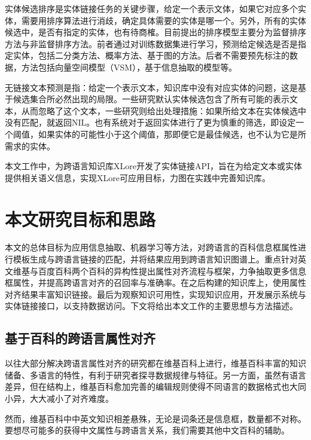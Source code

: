 {\heiti 实体候选排序}是实体链接任务的关键步骤，给定一个表示文体，如果它对应多个实体，需要用排序算法进行消歧，确定具体需要的实体是哪一个。另外，所有的实体候选中，是否有指定的实体，也有待商榷。目前提出的排序模型主要分为监督排序方法与非监督排序方法。前者通过对训练数据集进行学习，预测给定候选是否是指定实体，包括二分类方法\cite{zhang2010entity,lehmann2010lcc,monahan2011cross,chen2011collaborative}、概率方法\cite{han2011generative}、基于图的方法\cite{han2011collective}。后者不需要预先标注的数据，方法包括向量空间模型（VSM）\cite{cucerzan2007large,han2009nlpr_kbp}，基于信息抽取的模型\cite{varma2009iiit,gottipati2011linking}等。

{\heiti 无链接文本预测}是指：给定一个表示文本，知识库中没有对应实体的问题，这是基于候选集合所必然出现的局限。一些研究默认实体候选包含了所有可能的表示文本，从而忽略了这个文本\cite{cucerzan2007large,kulkarni2009collective,shen2012liege}，一些研究则给出处理措施：如果所给文本在实体候选中没有匹配，就返回NIL\cite{varma2009iiit}。也有系统对于返回实体进行了更为慎重的筛选，即设定一个阈值，如果实体的可能性小于这个阈值，那即便它是最佳候选，也不认为它是所需求的实体\cite{han2009nlpr_kbp,lehmann2010lcc,han2011generative}。

本文工作中，为跨语言知识库XLore开发了实体链接API，旨在为给定文本或实体提供相关语义信息，实现XLore可应用目标，力图在实践中完善知识库。

\section{本文研究目标和思路}
本文的总体目标为应用信息抽取、机器学习等方法，对跨语言的百科信息框属性进行模板生成与跨语言链接的匹配，并将结果应用到跨语言知识图谱上。重点针对英文维基与百度百科两个百科的异构性提出属性对齐流程与框架，力争抽取更多信息框属性，并提高跨语言对齐的召回率与准确率。在之后构建的知识库上，使用属性对齐结果丰富知识链接。最后为观察知识可用性，实现知识应用，开发展示系统与实体链接接口，以支持数据访问。下文将给出本文工作的主要思想与方法描述。

\subsection{基于百科的跨语言属性对齐}
以往大部分解决跨语言属性对齐的研究都在维基百科上进行，维基百科丰富的知识储备、多语言的特性，有利于研究者探寻数据规律与特征。另一方面，虽然有语言差异，但在结构上，维基百科愈加完善的编辑规则使得不同语言的数据格式也大同小异，大大减小了对齐难度。

然而，维基百科中中英文知识相差悬殊，无论是词条还是信息框，数量都不对称。要想尽可能多的获得中文属性与跨语言关系，我们需要其他中文百科的辅助。

